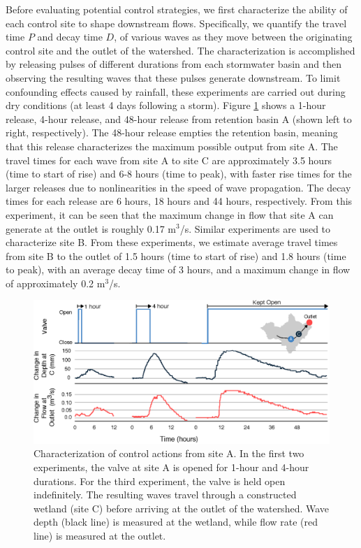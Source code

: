 Before evaluating potential control strategies, we first characterize the ability of each control site to shape downstream flows. Specifically, we quantify the travel time $P$ and decay time $D$, of various waves as they move between the originating control site and the outlet of the watershed. The characterization is accomplished by releasing pulses of different durations 
from each stormwater basin and then observing the resulting waves that these pulses generate downstream. To limit confounding effects caused by rainfall, these experiments are carried out during dry conditions (at least 4 days following a storm). Figure \ref{fig:3} shows a 1-hour release, 4-hour release, and 48-hour release from retention basin A (shown left to right, respectively). The 48-hour release empties the retention basin, meaning that this release characterizes the maximum possible output from site A. The travel times for each wave from site A to site C are approximately 3.5 hours (time to start of rise) and 6-8 hours (time to peak), with faster rise times for the larger releases due to nonlinearities in the speed of wave propagation. The decay times for each release are 6 hours, 18 hours and 44 hours, respectively. From this experiment, it can be seen that the maximum change in flow that site A can generate at the outlet is roughly 0.17 m$^3$/s.
Similar experiments are used to characterize site B. From these experiments, we estimate average travel times from site B to the outlet of 1.5 hours (time to start of rise) and 1.8 hours (time to peak), with an average decay time of 3 hours, and a maximum change in flow of approximately 0.2 m$^3$/s.

\begin{figure}[H]
    \centering
    \includegraphics[width=\textwidth]{gfx/Chapter-2/fod.eps}
    \caption{Characterization of
    control actions from site A. In the first two experiments,
    the valve at site A is opened for 1-hour and 4-hour durations. For the third experiment, the valve is held open indefinitely.
    The resulting waves travel through
    a constructed wetland (site C) %
    before arriving at the outlet of the watershed. Wave depth (black line) is measured at the wetland, while flow rate (red line) is measured at the outlet.}
    \label{fig:3}
\end{figure}


